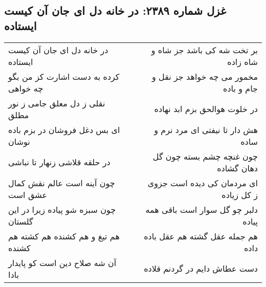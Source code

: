 \begin{center}
\section*{غزل شماره ۲۳۸۹: در خانه دل ای جان آن کیست ایستاده}
\label{sec:2389}
\begin{longtable}{l p{0.5cm} r}
در خانه دل ای جان آن کیست ایستاده
&&
بر تخت شه کی باشد جز شاه و شاه زاده
\\
کرده به دست اشارت کز من بگو چه خواهی
&&
مخمور می چه خواهد جز نقل و جام و باده
\\
نقلی ز دل معلق جامی ز نور مطلق
&&
در خلوت هوالحق بزم ابد نهاده
\\
ای بس دغل فروشان در بزم باده نوشان
&&
هش دار تا نیفتی ای مرد نرم و ساده
\\
در حلقه قلاشی زنهار تا نباشی
&&
چون غنچه چشم بسته چون گل دهان گشاده
\\
چون آینه است عالم نقش کمال عشق است
&&
ای مردمان کی دیده است جزوی ز کل زیاده
\\
چون سبزه شو پیاده زیرا در این گلستان
&&
دلبر چو گل سوار است باقی همه پیاده
\\
هم تیغ و هم کشنده هم کشته هم کشنده
&&
هم جمله عقل گشته هم عقل باده داده
\\
آن شه صلاح دین است کو پایدار بادا
&&
دست عطاش دایم در گردنم قلاده
\\
\end{longtable}
\end{center}
